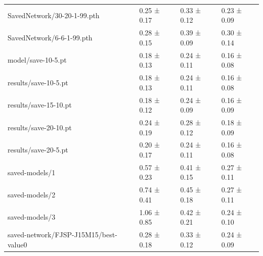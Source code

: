 \begin{tabular}{llll}
    SavedNetwork/30-20-1-99.pth & 0.25 ± 0.17 & 0.33 ± 0.12 & 0.23 ± 0.09 \\
    SavedNetwork/6-6-1-99.pth & 0.28 ± 0.15 & 0.39 ± 0.09 & 0.30 ± 0.14 \\
    model/save-10-5.pt & 0.18 ± 0.13 & 0.24 ± 0.11 & 0.16 ± 0.08 \\
    results/save-10-5.pt & 0.18 ± 0.13 & 0.24 ± 0.11 & 0.16 ± 0.08 \\
    results/save-15-10.pt & 0.18 ± 0.12 & 0.24 ± 0.09 & 0.16 ± 0.09 \\
    results/save-20-10.pt & 0.24 ± 0.19 & 0.28 ± 0.12 & 0.18 ± 0.09 \\
    results/save-20-5.pt & 0.20 ± 0.17 & 0.24 ± 0.11 & 0.16 ± 0.08 \\
    saved-models/1 & 0.57 ± 0.23 & 0.41 ± 0.15 & 0.27 ± 0.11 \\
    saved-models/2& 0.74 ± 0.41 & 0.45 ± 0.18 & 0.27 ± 0.11 \\
    saved-models/3 & 1.06 ± 0.85 & 0.42 ± 0.21 & 0.24 ± 0.10 \\
    saved-network/FJSP-J15M15/best-value0 & 0.28 ± 0.18 & 0.33 ± 0.12 & 0.24 ± 0.09 \\
    \bottomrule
\end{tabular}
